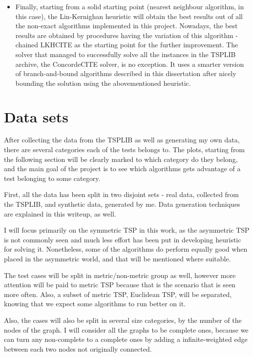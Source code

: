 \documentclass[12pt,twoside,notitlepage]{report}
\begin{document}
\begin{itemize}
\item Finally, starting from a solid starting point (nearest neighbour algorithm, in this case), the Lin-Kernighan heuristic will obtain the best results out of all the non-exact algorithms implemented in this project. Nowadays, the best results are obtained by procedures having the variation of this algorithm - chained LKHCITE as the starting point for the further improvement. The solver that managed to successfully solve all the instances in the TSPLIB archive, the ConcordeCITE solver, is no exception. It uses a smarter version of branch-and-bound algorithms described in this dissertation after nicely bounding the solution using the abovementioned heuristic.

\end{itemize}

\section{Data sets}

After collecting the data from the TSPLIB as well as generating my own data, there are several categories each of the tests belongs to. The plots, starting from the following section will be clearly marked to which category do they belong, and the main goal of the project is to see which algorithms gets advantage of a test belonging to some category.

First, all the data has been split in two disjoint sets - real data, collected from the TSPLIB, and synthetic data, generated by me. Data generation techniques are explained in this writeup, as well.

I will focus primarily on the symmetric TSP in this work, as the asymmetric TSP is not commonly seen and much less effort has been put in developing heuristic for solving it. Nonetheless, some of the algorithms do perform equally good when placed in the asymmetric world, and that will be mentioned where suitable.

The test cases will be split in metric/non-metric group as well, however more attention will be paid to metric TSP because that is the scenario that is seen more often. Also, a subset of metric TSP, Euclidean TSP, will be separated, knowing that we expect some algorithms to run better on it.

Also, the cases will also be split in several size categories, by the number of the nodes of the graph. I will consider all the graphs to be complete ones, because we can turn any non-complete to a complete ones by adding a infinite-weighted edge between each two nodes not originally connected.
\end{document}
